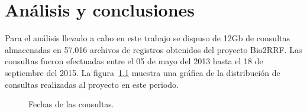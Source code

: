
\chapter{Análisis y conclusiones}

Para el análisis llevado a cabo en este trabajo se dispuso de 12Gb de consultas
almacenadas en 57.016 archivos de registros obtenidos del proyecto Bio2RRF. Las
consultas fueron efectuadas entre el 05 de mayo del 2013 hasta el 18 de
septiembre del 2015. La figura~\ref{fig:dates} muestra una gráfica de la
distribución de consultas realizadas al proyecto en este periodo.

\begin{figure}[h]
  \caption{Fechas de las consultas.}\label{fig:dates}
\end{figure}

